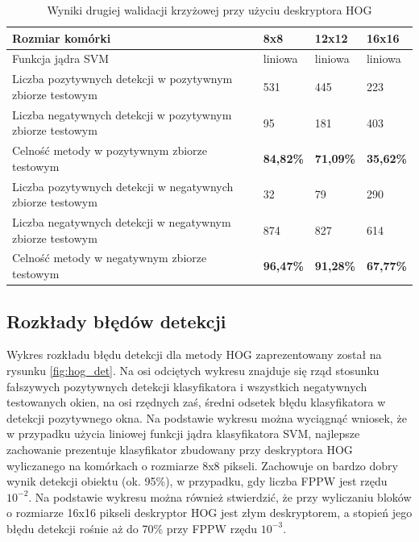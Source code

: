 \begin{center}
    \begin{longtable}{ | p{5cm} | p{3cm} | p{3cm} | p{3cm} |}
    \caption{Wyniki drugiej walidacji krzyżowej przy użyciu deskryptora HOG} 
    \label{tab:hog_second}\\
    \hline
	Rozmiar komórki & 8x8 & 12x12 & 16x16 \\ \hline
	Funkcja jądra SVM & liniowa & liniowa & liniowa  \\ \hline
    Liczba pozytywnych detekcji w pozytywnym zbiorze testowym & 531 & 445 & 223 \\ \hline
    Liczba negatywnych detekcji w pozytywnym zbiorze testowym & 95 & 181 & 403 \\ \hline
    Celność metody w pozytywnym zbiorze testowym & \textbf{84,82\%} & \textbf{71,09\%} & \textbf{35,62\%} \\ \hline
    Liczba pozytywnych detekcji w negatywnych zbiorze testowym & 32 & 79 & 290 \\ \hline
    Liczba negatywnych detekcji w negatywnym zbiorze testowym & 874 & 827 & 614 \\ \hline
    Celność metody w negatywnym zbiorze testowym & \textbf{96,47\%} & \textbf{91,28\%} & \textbf{67,77\%} \\ \hline
    \end{longtable}
\end{center}

\clearpage

\subsection{Rozkłady błędów detekcji}

Wykres rozkładu błędu detekcji dla metody HOG zaprezentowany został na rysunku \ref{fig:hog_det}.
Na osi odciętych wykresu znajduje się rząd stosunku fałszywych pozytywnych detekcji klasyfikatora i wszystkich negatywnych testowanych okien, na osi rzędnych zaś, średni odsetek błędu klasyfikatora w detekcji pozytywnego okna. Na podstawie wykresu można wyciągnąć wniosek, że w przypadku użycia liniowej funkcji jądra klasyfikatora SVM, najlepsze zachowanie prezentuje klasyfikator zbudowany przy deskryptora HOG wyliczanego na komórkach o rozmiarze 8x8 pikseli. Zachowuje on bardzo dobry wynik detekcji obiektu (ok. 95\%), w przypadku, gdy liczba FPPW jest rzędu $10^{-2}$. Na podstawie wykresu można również stwierdzić, że przy wyliczaniu bloków o rozmiarze 16x16 pikseli deskryptor HOG jest złym deskryptorem, a stopień jego błędu detekcji rośnie aż do 70\% przy FPPW rzędu $10^{-3}$.

